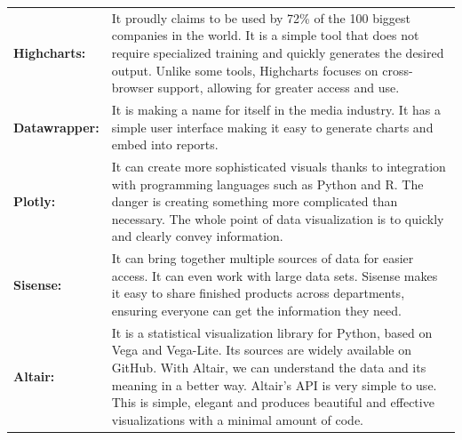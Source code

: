 \documentclass[]{book}
\begin{document}
\begin{longtable}[]{@{}ll@{}}
\begin{minipage}[t]{0.15\columnwidth}
\textbf{Highcharts:}\strut
\end{minipage} & \begin{minipage}[t]{0.79\columnwidth}\raggedright
It proudly claims to be used by 72\% of the 100 biggest companies in the world. It is a simple tool that does not require specialized training and quickly generates the desired output. Unlike some tools, Highcharts focuses on cross-browser support, allowing for greater access and use.\strut
\end{minipage}\tabularnewline
\begin{minipage}[t]{0.15\columnwidth}\raggedright
\textbf{Datawrapper:}\strut
\end{minipage} & \begin{minipage}[t]{0.79\columnwidth}\raggedright
It is making a name for itself in the media industry. It has a simple user interface making it easy to generate charts and embed into reports.\strut
\end{minipage}\tabularnewline
\begin{minipage}[t]{0.15\columnwidth}\raggedright
\textbf{Plotly:}\strut
\end{minipage} & \begin{minipage}[t]{0.79\columnwidth}\raggedright
It can create more sophisticated visuals thanks to integration with programming languages such as Python and R. The danger is creating something more complicated than necessary. The whole point of data visualization is to quickly and clearly convey information.\strut
\end{minipage}\tabularnewline
\begin{minipage}[t]{0.15\columnwidth}\raggedright
\textbf{Sisense:}\strut
\end{minipage} & \begin{minipage}[t]{0.79\columnwidth}\raggedright
It can bring together multiple sources of data for easier access. It can even work with large data sets. Sisense makes it easy to share finished products across departments, ensuring everyone can get the information they need.\strut
\end{minipage}\tabularnewline
\begin{minipage}[t]{0.15\columnwidth}\raggedright
\textbf{Altair:}\strut
\end{minipage} & \begin{minipage}[t]{0.79\columnwidth}\raggedright
It is a statistical visualization library for Python, based on Vega and Vega-Lite. Its sources are widely available on GitHub. With Altair, we can understand the data and its meaning in a better way. Altair's API is very simple to use. This is simple, elegant and produces beautiful and effective visualizations with a minimal amount of code.\strut

\end{minipage}
\end{longtable}
\end{document}
